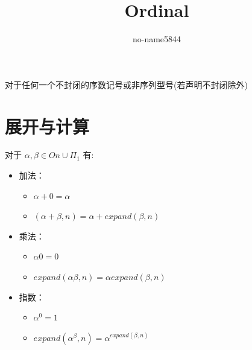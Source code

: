 \documentclass[UTF8]{ctexart}
\title{Ordinal}
\author{no-name5844}
\begin{document}
\maketitle

对于任何一个不封闭的序数记号或非序列型号(若声明不封闭除外)

\section{展开与计算}
对于 $\alpha,\beta\in On\cup\Pi_1$ 有:
\begin{itemize}
  \item 加法：
  \begin{itemize}
    \item $\alpha+0=\alpha$
    \item $(\alpha+\beta,n)=\alpha+expand(\beta,n)$
  \end{itemize}
  \item 乘法：
  \begin{itemize}
    \item $\alpha 0=0$
    \item $expand(\alpha\beta,n)=\alpha expand(\beta,n)$
  \end{itemize}
  \item 指数：
  \begin{itemize}
    \item $\alpha^0=1$
    \item $expand(\alpha^{\beta},n)=\alpha^{expand(\beta,n)}$
  \end{itemize}
\end{itemize}
\end{document}
